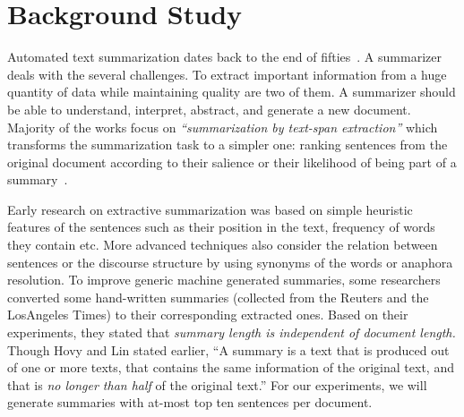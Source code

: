 \documentclass[a4paper]{report}
\begin{document}
\section{Background Study}
\par Automated text summarization dates back to the end of fifties~\cite{Luhn:1958:ACL:1662353.1662360}. A summarizer deals with the several challenges. To extract important information from a huge quantity of data while maintaining quality are two of them. A summarizer should be able to understand, interpret, abstract, and generate a new document.
Majority of the works focus on \emph{``summarization by text-span extraction''} which transforms the summarization task to a simpler one: ranking sentences from the original document according to their salience or their likelihood of being part of a summary~\cite{Goldstein:1999:STD:312624.312665}.
\par Early research on extractive summarization was based on simple heuristic features of the sentences such as their position in the text, frequency of words they contain etc. More advanced techniques also consider
the relation between sentences or the discourse structure by using synonyms of the words or anaphora resolution. 
To improve generic machine generated summaries, some researchers~\cite{Goldstein:1999:STD:312624.312665} converted some hand-written summaries (collected from the Reuters and the LosAngeles Times) to their corresponding extracted ones.  Based on their experiments, they stated that \emph{summary length is independent of document length.} Though Hovy and Lin \cite{Hovy:1998:ATS:1119089.1119121} stated earlier, ``A summary is a text that is produced out of one or more texts, that contains the same information of the original text, and that is {\em no longer than half} of the original text.'' For our experiments, we will generate summaries with at-most top ten sentences per document.
\end{document}
